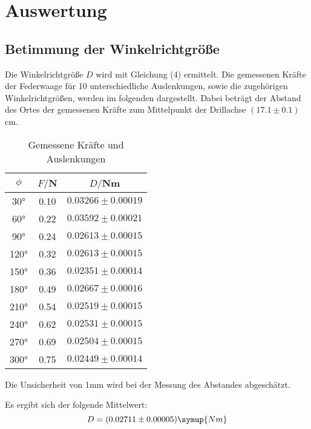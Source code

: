 \section{Auswertung}
\label{sec:Auswertung}
\subsection{Betimmung der Winkelrichtgröße}
Die Winkelrichtgröße $D$ wird mit Gleichung (4) ermittelt.
Die gemessenen Kräfte der Federwaage für 10 unterschiedliche Auslenkungen, sowie
die zugehörigen Winkelrichtgrößen, werden im folgenden dargestellt. Dabei beträgt
der Abstand des Ortes der gemessenen Kräfte zum Mittelpunkt der Drillachse
$(17.1 \pm 0.1)$cm.

\begin{table}[H]
  \centering
  \caption{Gemessene Kräfte und Auslenkungen}
  \label{tab:Parameter}
  \begin{tabular}{c c c}
    \toprule
    $\phi$ & $F/$N & $D/$Nm \\
    \bottomrule
     30° & 0.10  & $0.03266 \pm 0.00019$ \\
     60° & 0.22  & $0.03592 \pm 0.00021$ \\
     90° & 0.24  & $0.02613 \pm 0.00015$ \\
    120° & 0.32  & $0.02613 \pm 0.00015$ \\
    150° & 0.36  & $0.02351 \pm 0.00014$ \\
    180° & 0.49  & $0.02667 \pm 0.00016$ \\
    210° & 0.54  & $0.02519 \pm 0.00015$ \\
    240° & 0.62  & $0.02531 \pm 0.00015$ \\
    270° & 0.69  & $0.02504 \pm 0.00015$ \\
    300° & 0.75  & $0.02449 \pm 0.00014$ \\
    \bottomrule
  \end{tabular}
\end{table}

Die Unsicherheit von 1mm wird bei der Messung des Abstandes
abgeschätzt.

Es ergibt sich der folgende Mittelwert:
\begin{equation}
  D = (0.02711 \pm 0.00005) \symup{Nm}
\end{equation}

